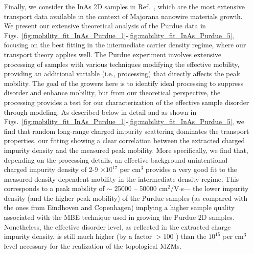 \documentclass[aps,prmaterials,twocolumn,superscriptaddress,longbibliography]{revtex4-2}
\begin{document}
Finally, we consider the InAs 2D samples in Ref.~, which are the most extensive transport data available in the context of Majorana nanowire materials growth.  We present our extensive theoretical analysis of the Purdue data in Figs.~\ref{fig:mobility_fit_InAs_Purdue_1}-\ref{fig:mobility_fit_InAs_Purdue_5}, focusing on the best fitting in the intermediate carrier density regime, where our transport theory applies well. The Purdue experiment involves extensive processing of samples with various techniques modifying the effective mobility, providing an additional variable (i.e., processing) that directly affects the peak mobility. The goal of the growers here is to identify ideal processing to suppress disorder and enhance mobility, but from our theoretical perspective, the processing provides a test for our characterization of the effective sample disorder through modeling. 
As described below in detail and as shown in Figs.~\ref{fig:mobility_fit_InAs_Purdue_1}-\ref{fig:mobility_fit_InAs_Purdue_5}, we find that random long-range charged impurity scattering dominates the transport properties, our fitting showing a clear correlation between the extracted charged impurity density and the measured peak mobility. More specifically, we find that, depending on the processing details, an effective background unintentional charged impurity density of 2-9 $\times 10^{17} $  per cm$ ^3 $  provides a very good fit to the measured density-dependent mobility in the intermediate density regime.  This corresponds to a peak mobility of $ \sim $  25000 – 50000 cm$ ^2 $/V$ \cdot $s--- the lower impurity density (and the higher peak mobility) of the Purdue samples (as compared with the ones from Eindhoven and Copenhagen) implying a higher sample quality associated with the MBE technique used in growing the Purdue 2D samples.  Nonetheless, the effective disorder level, as reflected in the extracted charge impurity density, is still much higher (by a factor $ >100 $ ) than the $ 10^{15} $  per cm$ ^3 $ level necessary for the realization of the topological MZMs. 
\end{document}
